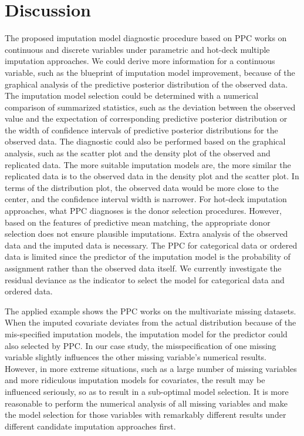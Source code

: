 \documentclass[12pt, fullpage, a4paper]{article}
\begin{document}
\section{Discussion}
The proposed imputation model diagnostic procedure based on PPC works on continuous and discrete variables under parametric and hot-deck multiple imputation approaches. We could derive more information for a continuous variable, such as the blueprint of imputation model improvement, because of the graphical analysis of the predictive posterior distribution of the observed data. The imputation model selection could be determined with a numerical comparison of summarized statistics, such as the deviation between the observed value and the expectation of corresponding predictive posterior distribution or the width of confidence intervals of predictive posterior distributions for the observed data. The diagnostic could also be performed based on the graphical analysis, such as the scatter plot and the density plot of the observed and replicated data. The more suitable imputation models are, the more similar the replicated data is to the observed data in the density plot and the scatter plot. In terms of the distribution plot, the observed data would be more close to the center, and the confidence interval width is narrower. For hot-deck imputation approaches, what PPC diagnoses is the donor selection procedures. However, based on the features of predictive mean matching, the appropriate donor selection does not ensure plausible imputations. Extra analysis of the observed data and the imputed data is necessary. The PPC for categorical data or ordered data is limited since the predictor of the imputation model is the probability of assignment rather than the observed data itself. We currently investigate the residual deviance as the indicator to select the model for categorical data and ordered data. 

The applied example shows the PPC works on the multivariate missing datasets. When the imputed covariate deviates from the actual distribution because of the mis-specified imputation models, the imputation model for the predictor could also selected by PPC. In our case study, the misspecification of one missing variable slightly influences the other missing variable's numerical results. However, in more extreme situations, such as a large number of missing variables and more ridiculous imputation models for covariates, the result may be influenced seriously, so as to result in a sub-optimal model selection. It is more reasonable to perform the numerical analysis of all missing variables and make the model selection for those variables with remarkably different results under different candidate imputation approaches first. 
\end{document}
